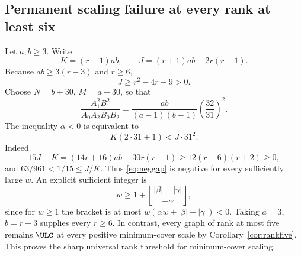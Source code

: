 \subsection{Permanent scaling failure at every rank at least six}
Let $a,b\ge3$. Write
\[
 K=(r-1)ab,\qquad J=(r+1)ab-2r(r-1).
\]
Because $ab\ge3(r-3)$ and $r\ge6$,
\[
 J\ge r^2-4r-9>0.
\]
Choose $N=b+30$, $M=a+30$, so that
\[
 \frac{A_1^2B_1^2}{A_0A_2B_0B_2}
 =\frac{ab}{(a-1)(b-1)}\left(\frac{32}{31}\right)^2.
\]
The inequality $\alpha<0$ is equivalent to
\[
 K(2\cdot31+1)<J\cdot31^2.
\]
Indeed
\[
 15J-K=(14r+16)ab-30r(r-1)
 \ge12(r-6)(r+2)\ge0,
\]
and $63/961<1/15\le J/K$. Thus \eqref{eq:neggap} is negative for every sufficiently large $w$. An explicit sufficient integer is
\[
 w\ge1+\left\lfloor\frac{|\beta|+|\gamma|}{-\alpha}\right\rfloor,
\]
since for $w\ge1$ the bracket is at most $w(\alpha w+|\beta|+|\gamma|)<0$.
Taking $a=3$, $b=r-3$ supplies every $r\ge6$. In contrast, every graph of rank at most five remains $\ULC$ at every positive minimum-cover scale by Corollary~\ref{cor:rankfive}. This proves the sharp universal rank threshold for minimum-cover scaling.
